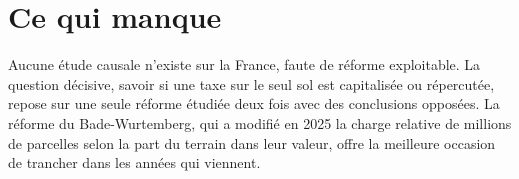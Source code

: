 \documentclass[11pt,a4paper]{article}
\begin{document}
\section*{Ce qui manque}

Aucune étude causale n'existe sur la France, faute de réforme exploitable. La question décisive,
savoir si une taxe sur le seul sol est capitalisée ou répercutée, repose sur une seule réforme
étudiée deux fois avec des conclusions opposées. La réforme du Bade-Wurtemberg, qui a modifié en
2025 la charge relative de millions de parcelles selon la part du terrain dans leur valeur, offre
la meilleure occasion de trancher dans les années qui viennent.
\end{document}
